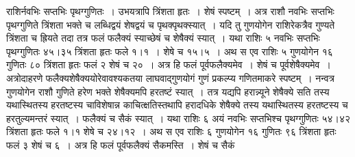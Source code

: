 \documentclass[11pt, openany]{book}
\begin{document}
\begin{sloppypar}
राशिर्नवभिः सप्तभिः पृथग्गुणितः~। उभयत्रापि त्रिंशता हृतः~। शेषं स्पष्टम्~। अत्र राशौ नवभिः सप्तभिः पृथग्गुणिते त्रिंशता भक्ते च लब्धिद्वयं शेषद्वयं च पृथक्पृथक्स्यात्~। यदि तु गुणयोगेन राशिरेकत्रैव गुण्यते त्रिंशता च ह्रियते तदा तत्र फलं फलैक्यं स्याच्छेषं च शेषैक्यं स्यात्~। यथा राशिः ५ नवभिः सप्तभिः पृथग्गुणितः ४५।३५ त्रिंशता हृतः फले १।१~। शेषे च १५।५~। अथ स एव राशिः ५ गुणयोगेन १६ गुणितः ८० त्रिंशता हृतः फलं २ शेषं च २०~। अत्र हि फलं पूर्वफलैक्यमेव~। शेषं च पूर्वशेषैक्यमेव~। अत्रोदाहरणे फलैक्यशेषैक्ययोरेवावश्यकतया लाघवाद्गुणयोगं गुणं प्रकल्प्य गणितमाकरे स्पष्टम्~। नन्वत्र गुणयोगेन राशौ गुणिते हरेण भक्ते शेषैक्यमपि हरतष्टं स्यात्~। तत्र यद्यपि हरान्न्यूने शेषैक्ये सति तस्य यथास्थितस्य हरतष्टस्य चाविशेषान्न काचित्क्षतिस्तथापि हरादधिके शेषैक्ये तस्य यथास्थितस्य हरतष्टस्य च हरतुल्यमन्तरं स्यात्~। फलैक्यं च सैकं स्यात्~। यथा राशिः ६ अयं नवभिः सप्तभिश्च पृथग्गुणितः ५४।४२ त्रिंशता हृतः फले १।१ शेषे च २४।१२~। अथ स एव राशिः ६ गुणयोगेन १६ गुणितः ९६ त्रिंशता हृतः फलं ३ शेषं च ६~। अत्र हि फलं पूर्वफलैक्यं सैकमस्ति~। शेषं च सैकं
\end{sloppypar}

\newpage
\end{document}
